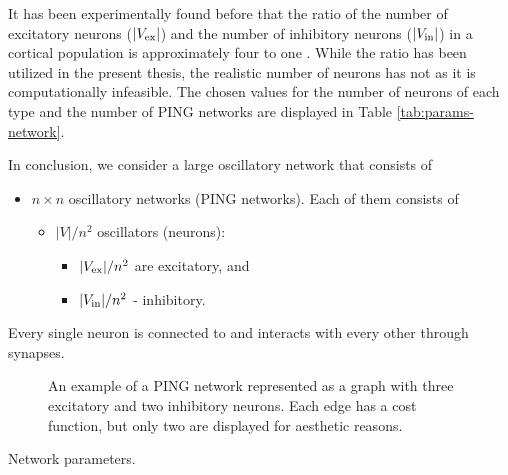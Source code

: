 It has been experimentally found before that the ratio of the number of excitatory neurons ($|V_{\mathrm{ex}}|$) and the number of inhibitory neurons ($|V_{\mathrm{in}}|$) in a cortical population is approximately four to one \cite{Pastore2018}. While the ratio has been utilized in the present thesis, the realistic number of neurons has not as it is computationally infeasible. The chosen values for the number of neurons of each type and the number of PING networks are displayed in Table \ref{tab:params-network}.

In conclusion, we consider a large oscillatory network that consists of
\startbulletsnospace
\begin{itemize}
    \item $n \times n$ oscillatory networks (PING networks). Each of them consists of
    \vspace{-0.5em}
    \begin{itemize}
        \item $|V| / n^2$ oscillators (neurons):
        \begin{itemize}
            \item $|V_{\mathrm{ex}}| / n^2$ are excitatory, and
            \item $|V_{\mathrm{in}}| / n^2$ - inhibitory.
        \end{itemize}
    \end{itemize}
\end{itemize}
\startbulletsnospace
Every single neuron is connected to and interacts with every other through synapses. 

\begin{figure}[H]
    \centering
    
    \caption[PING network as a graph]{An example of a PING network represented as a graph with three excitatory and two inhibitory neurons. Each edge has a cost function, but only two are displayed for aesthetic reasons.}
    \label{fig:single-ping-graph}
\end{figure}

\begin{table}[H]
    \centering
    
    \caption{Network parameters.}
    \label{tab:params-network}
\end{table}